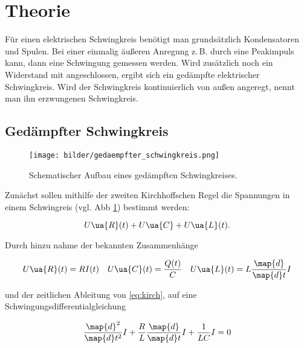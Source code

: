 \setcounter{page}{1}

\section{Theorie}

Für einen elektrischen Schwingkreis benötigt man grundsätzlich
Kondensatoren und Spulen. %
Bei einer einmalig äußeren Anregung z.\,B. durch eine Peakimpuls %
kann, dann eine Schwingung gemessen werden. %
Wird zusätzlich noch ein Widerstand mit angeschlossen, ergibt sich ein
gedämpfte elektrischer Schwingkreis. %
Wird der Schwingkreis kontinuierlich von außen angeregt, nennt man
ihn erzwungenen Schwingkreis.

\subsection{Gedämpfter Schwingkreis}
\begin{figure}
  \centering
  \texttt{[image: bilder/gedaempfter\_schwingkreis.png]}
  \caption{Schematischer Aufbau eines gedämpften Schwingkreises\cite{anleitung354}. }
  \label{fig:gedaempft}
  \end{figure}
Zunächst sollen mithilfe der zweiten %
Kirchhoffschen Regel die Spannungen in einem Schwingreis (vgl. Abb \ref{fig:gedaempft}) %
bestimmt werden:

\begin{equation}
  \label{eq:kirch}
U\ua{R}(t)+U\ua{C}+U\ua{L}(t).
\end{equation}

Durch hinzu nahme der bekannten Zusammenhänge %

\begin{equation*}
U\ua{R}(t)=RI(t) \quad U\ua{C}(t)=\frac{Q(t)}{C} \quad U\ua{L}(t)=L\frac{\map{d}}{\map{d}t}I
\end{equation*}

und der zeitlichen Ableitung von \eqref{eq:kirch}, auf eine Schwingungsdifferentialgleichung %

\begin{equation}
  \label{eq:differntialgleichung_1}
\frac{\map{d}^2}{\map{d}t^2}I+\frac{R}{L}\frac{\map{d}}{\map{d}t}I+\frac{1}{LC}I=0
\end{equation}

